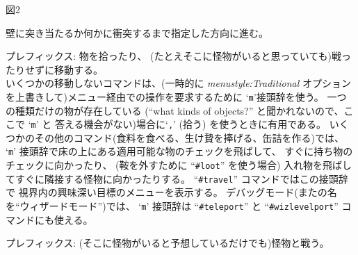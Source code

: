 \begin{center}
図2
\end{center}
\item[\tb{[YUHJKLBN]}]
壁に突き当たるか何かに衝突するまで指定した方向に進む。
\item[\tb{m[yuhjklbn]}]
プレフィックス: 物を拾ったり、
(たとえそこに怪物がいると思っていても)戦ったりせずに移動する。\\
いくつかの移動しないコマンドは、(一時的に
{\it menustyle:Traditional\/}
オプションを上書きして)メニュー経由での操作を要求するために
`{\tt m}'接頭辞を使う。
一つの種類だけの物が存在している
(``what kinds of objects?'' と聞かれないので、ここで `{\tt m}' と
答える機会がない)場合に`{\tt ,}' (拾う) を使うときに有用である。
いくつかのその他のコマンド(食料を食べる、生け贄を捧げる、缶詰を作る)では、
`{\tt m}' 接頭辞で床の上にある適用可能な物のチェックを飛ばして、
すぐに持ち物のチェックに向かったり、
(鞍を外すために ``{\tt \#loot}'' を使う場合)
入れ物を飛ばしてすぐに隣接する怪物に向かったりする。
``{\tt \#travel}'' コマンドではこの接頭辞で
視界内の興味深い目標のメニューを表示する。
デバッグモード(またの名を``ウィザードモード'')では、
`{\tt m}' 接頭辞は
``{\tt \#teleport}'' と ``{\tt \#wizlevelport}'' コマンドにも使える。
\item[\tb{F[yuhjklbn]}]
プレフィックス: (そこに怪物がいると予想しているだけでも)怪物と戦う。
